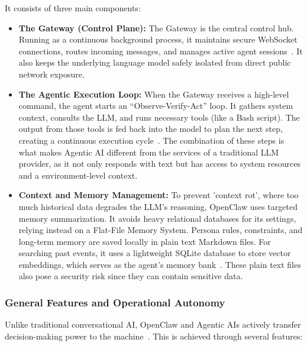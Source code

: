 \documentclass[a4paper]{report}
\begin{document}
It consists of three main components:

\begin{itemize}
    \item \textbf{The Gateway (Control Plane):} The Gateway is the central control hub. Running as a continuous background process, it maintains secure WebSocket connections, routes incoming messages, and manages active agent sessions~\cite{foerster2026camels}. It also keeps the underlying language model safely isolated from direct public network exposure.

    \item \textbf{The Agentic Execution Loop:} When the Gateway receives a high-level command, the agent starts an ``Observe-Verify-Act'' loop. It gathers system context, consults the LLM, and runs necessary tools (like a Bash script). The output from those tools is fed back into the model to plan the next step, creating a continuous execution cycle~\cite{foerster2025singleshot}. The combination of these steps is what makes Agentic AI different from the services of a traditional LLM provider, as it not only responds with text but has access to system resources and a environment-level context.

    \item \textbf{Context and Memory Management:} To prevent 'context rot', where too much historical data degrades the LLM's reasoning, OpenClaw uses targeted memory summarization. It avoids heavy relational databases for its settings, relying instead on a Flat-File Memory System. Persona rules, constraints, and long-term memory are saved locally in plain text Markdown files. For searching past events, it uses a lightweight SQLite database to store vector embeddings, which serves as the agent's memory bank~\cite{ji2025taming}. These plain text files also pose a security risk since they can contain sensitive data.

\end{itemize}

\subsubsection{General Features and Operational Autonomy}

Unlike traditional conversational AI, OpenClaw and Agentic AIs actively transfer decision-making power to the machine~\cite{ji2025taming}. This is achieved through several features:
\end{document}
